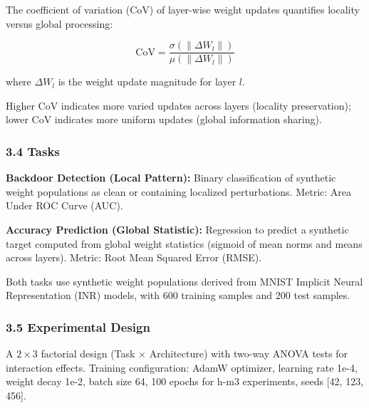 The coefficient of variation (CoV) of layer-wise weight updates quantifies locality versus global processing:

$$\text{CoV} = \frac{\sigma(\|\Delta W_l\|)}{\mu(\|\Delta W_l\|)}$$

where $\Delta W_l$ is the weight update magnitude for layer $l$.

Higher CoV indicates more varied updates across layers (locality preservation); lower CoV indicates more uniform updates (global information sharing).

\subsubsection{3.4 Tasks}

\textbf{Backdoor Detection (Local Pattern):} Binary classification of synthetic weight populations as clean or containing localized perturbations. Metric: Area Under ROC Curve (AUC).

\textbf{Accuracy Prediction (Global Statistic):} Regression to predict a synthetic target computed from global weight statistics (sigmoid of mean norms and means across layers). Metric: Root Mean Squared Error (RMSE).

Both tasks use synthetic weight populations derived from MNIST Implicit Neural Representation (INR) models, with 600 training samples and 200 test samples.

\subsubsection{3.5 Experimental Design}

A $2\times 3$ factorial design (Task $\times$ Architecture) with two-way ANOVA tests for interaction effects. Training configuration: AdamW optimizer, learning rate 1e-4, weight decay 1e-2, batch size 64, 100 epochs for h-m3 experiments, seeds [42, 123, 456].

